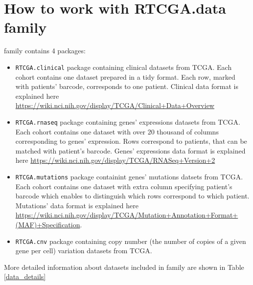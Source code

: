 \section{How to work with RTCGA.data
family}\label{how-to-work-with-rtcga.data-family}

 family contains 4 packages:

\begin{itemize}
\itemsep1pt\parskip0pt
\item
  \texttt{RTCGA.clinical} package containing clinical datasets from
  TCGA. Each cohort contains one dataset prepared in a tidy format. Each
  row, marked with patients' barcode, corresponds to one patient.
  Clinical data format is explained here
  \url{https://wiki.nci.nih.gov/display/TCGA/Clinical+Data+Overview}
\item
  \texttt{RTCGA.rnaseq} package containing genes' expressions datasets
  from TCGA. Each cohort contains one dataset with over 20 thousand of
  columns corresponding to genes' expression. Rows correspond to
  patients, that can be matched with patient's barcode. Genes'
  expressions data format is explained here
  \url{https://wiki.nci.nih.gov/display/TCGA/RNASeq+Version+2}
\item
  \texttt{RTCGA.mutations} package containint genes' mutations datsets
  from TCGA. Each cohort contains one dataset with extra column
  specifying patient's barcode which enables to distinguish which rows
  correspond to which patient. Mutations' data format is explained here
  \url{https://wiki.nci.nih.gov/display/TCGA/Mutation+Annotation+Format+(MAF)+Specification}.
\item
  \texttt{RTCGA.cnv} package containing copy number (the number of
  copies of a given gene per cell) variation datasets from TCGA.
\end{itemize}

More detailed information about datasets included in 
family are shown in Table \ref{data_details}

